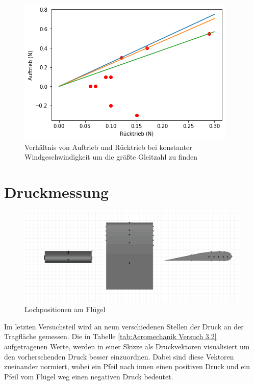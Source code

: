 \begin{figure}
    \centering
    \includegraphics[scale=0.8]{Aeromechanik/Protokoll/fig/Aeromechanik Versuch 3.13.png}
    \caption{Verhältnis von Auftrieb und Rücktrieb bei konstanter Windgeschwindigkeit um die größte Gleitzahl zu finden}
    \label{fig:Aeromechanik Versuch 3.13}
\end{figure}

\section{Druckmessung}

\begin{figure}[h!]
    \centering
    \includegraphics[scale=0.5]{./Aeromechanik/Protokoll/fig/lochpos.png}
    \caption{Lochpositionen am Flügel}
    \label{fig:Venturi}
\end{figure}

Im letzten Versuchsteil wird an neun verschiedenen Stellen der Druck an der Tragfläche gemessen. Die in Tabelle \ref{tab:Aeromechanik Versuch 3.2} aufgetragenen Werte, werden in einer Skizze als Druckvektoren visualisiert um den vorherschenden Druck besser einzuordnen. Dabei sind diese Vektoren zueinander normiert, wobei ein Pfeil nach innen einen positiven Druck und ein Pfeil vom Flügel weg einen negativen Druck bedeutet.

